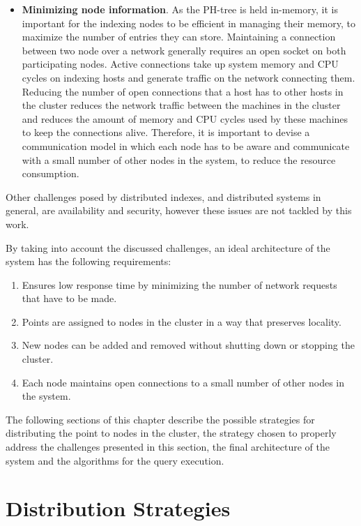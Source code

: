 \documentclass[11pt,a4paper]{globis-book}
\begin{document}
\begin{itemize}
    \item \textbf{Minimizing node information}. As the PH-tree is held in-memory, it is important for the indexing nodes to be efficient in managing their memory, to maximize the number of entries they can store. Maintaining a connection between two node over a network generally requires an open socket on both participating nodes. Active connections take up system memory and CPU cycles on indexing hosts and generate traffic on the network connecting them. Reducing the number of open connections that a host has to other hosts in the cluster reduces the network traffic between the machines in the cluster and reduces the amount of memory and CPU cycles used by these machines to keep the connections alive. Therefore, it is important to devise a communication model in which each node has to be aware and communicate with a small number of other nodes in the system, to reduce the resource consumption.
\end{itemize}

Other challenges posed by distributed indexes, and distributed systems in general, are availability and security, however these issues are not tackled by this work.

By taking into account the discussed challenges, an ideal architecture of the system has the following requirements:
\begin{enumerate}
    \item Ensures low response time by minimizing the number of network requests that have to be made.        
    \item Points are assigned to nodes in the cluster in a way that preserves locality.
    \item New nodes can be added and removed without shutting down or stopping the cluster.
    \item Each node maintains open connections to a small number of other nodes in the system.
\end{enumerate}

The following sections of this chapter describe the possible strategies for distributing the point to nodes in the cluster, the strategy chosen to properly address the challenges presented in this section, the final architecture of the system and the algorithms for the query execution.

\section{Distribution Strategies}
\label{sec:distindex-strategies}
\end{document}
